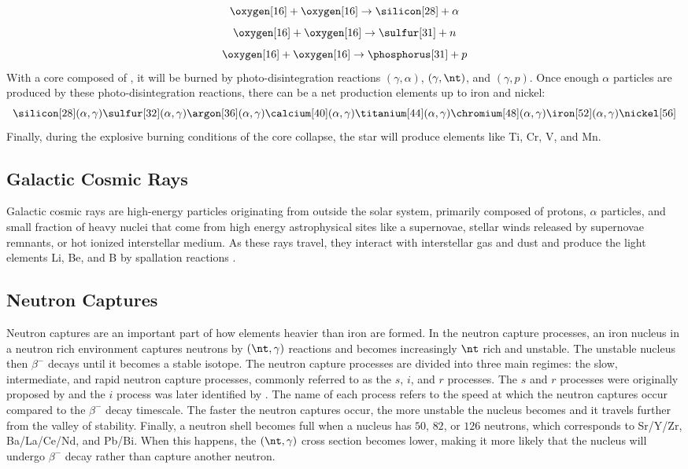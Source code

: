 \[
    \oxygen[16]+\oxygen[16]\rightarrow\silicon[28] + \alpha
\]
\[
    \oxygen[16] + \oxygen[16] \rightarrow \sulfur[31] + n
\]
\[
    \oxygen[16] + \oxygen[16] \rightarrow \phosphorus[31] + p
\]
With a core composed of \silicon[28], it will be burned by photo-disintegration reactions $(\gamma,\alpha)$, $(\gamma,\nt)$, and $(\gamma,p)$.
Once enough $\alpha$ particles are produced by these photo-disintegration reactions, there can be a net production elements up to iron and nickel:
\[
    \silicon[28](\alpha,\gamma)\sulfur[32](\alpha,\gamma)\argon[36](\alpha,\gamma)\calcium[40](\alpha,\gamma)\titanium[44](\alpha,\gamma)\chromium[48](\alpha,\gamma)\iron[52](\alpha,\gamma)\nickel[56]
\]
Finally, during the explosive burning conditions of the core collapse, the star will produce elements like Ti, Cr, V, and Mn.

\subsection{Galactic Cosmic Rays}

Galactic cosmic rays are high-energy particles originating from outside the solar system, primarily composed of protons, $\alpha$ particles, and small fraction of heavy nuclei that come from high energy astrophysical sites like a supernovae, stellar winds released by supernovae remnants, or hot ionized interstellar medium.
As these rays travel, they interact with interstellar gas and dust and produce the light elements Li, Be, and B by spallation reactions \citep{mitlerCosmicRayProductionDeuterium1970, mewaldtElementalCompositionEnergy1988, meyerGalacticCosmicRays1997, iliadisNuclearPhysicsStars2015, lingenfelterOriginCosmicRays2019, tatischeffOriginGalacticCosmic2021}.

\subsection{Neutron Captures}

Neutron captures are an important part of how elements heavier than iron are formed.
In the neutron capture processes, an iron nucleus in a neutron rich environment captures neutrons by $(\nt,\gamma)$ reactions and becomes increasingly $\nt$ rich and unstable.
The unstable nucleus then $\beta^-$ decays until it becomes a stable isotope.
The neutron capture processes are divided into three main regimes: the slow, intermediate, and rapid neutron capture processes, commonly referred to as the $s$, $i$, and $r$ processes.
The $s$ and $r$ processes were originally proposed by \cite{burbidgeSynthesisElementsStars1957} and the $i$ process was later identified by \cite{cowanProduction14CNeutrons1977}.
The name of each process refers to the speed at which the neutron captures occur compared to the $\beta^-$ decay timescale.
The faster the neutron captures occur, the more unstable the nucleus becomes and it travels further from the valley of stability.
Finally, a neutron shell becomes full when a nucleus has $50$, $82$, or $126$ neutrons, which corresponds to Sr/Y/Zr, Ba/La/Ce/Nd, and Pb/Bi.
When this happens, the $(\nt,\gamma)$ cross section becomes lower, making it more likely that the nucleus will undergo $\beta^-$ decay rather than capture another neutron.

